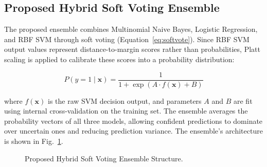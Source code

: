\documentclass[conference]{IEEEtran}
\begin{document}
\subsection{Proposed Hybrid Soft Voting Ensemble}

The proposed ensemble combines Multinomial Naive Bayes, Logistic Regression, and RBF SVM through soft voting (Equation~\ref{eq:softvote}). Since RBF SVM output values represent distance-to-margin scores rather than probabilities, Platt scaling is applied to calibrate these scores into a probability distribution:

\begin{equation}
  P(y = 1 \mid \mathbf{x}) = \frac{1}{1 + \exp(A \cdot f(\mathbf{x}) + B)}
\end{equation}

\noindent where $f(\mathbf{x})$ is the raw SVM decision output, and parameters $A$ and $B$ are fit using internal cross-validation on the training set. The ensemble averages the probability vectors of all three models, allowing confident predictions to dominate over uncertain ones and reducing prediction variance. The ensemble's architecture is shown in Fig.~\ref{fig:ensemble}.

\begin{figure}[!t]
  \centering
  \caption{Proposed Hybrid Soft Voting Ensemble Structure.}
  \label{fig:ensemble}
\end{figure}
\end{document}
